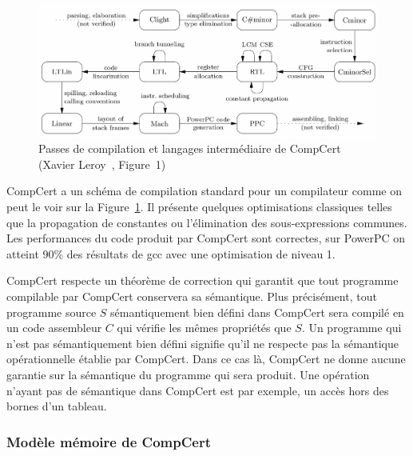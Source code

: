 \documentclass[11pt]{sdm}
\begin{document}
\begin{figure}
\centering
\includegraphics[scale=0.32]{images/compcert_pass.png}
\caption{Passes de compilation et langages intermédiaire de CompCert (Xavier Leroy~\cite{Leroy:2009:FVR:1538788.1538814}, Figure~1)}
\label{compcert_passes}
\end{figure}

CompCert a un schéma de compilation standard pour un compilateur comme on peut le voir sur la Figure~\ref{compcert_passes}. Il présente quelques optimisations classiques telles que la propagation de constantes ou l'élimination des sous-expressions communes. Les performances du code produit par CompCert sont correctes, sur PowerPC on atteint 90\% des résultats de gcc avec une optimisation de niveau 1.

CompCert respecte un théorème de correction qui garantit que tout programme compilable par CompCert conservera sa sémantique. Plus précisément, tout programme source $S$ sémantiquement bien défini dans CompCert sera compilé en un code assembleur $C$ qui vérifie les mêmes propriétés que $S$. Un programme qui n'est pas sémantiquement bien défini signifie qu'il ne respecte pas la sémantique opérationnelle établie par CompCert. Dans ce cas là, CompCert ne donne aucune garantie sur la sémantique du programme qui sera produit. Une opération n'ayant pas de sémantique dans CompCert est par exemple, un accès hors des bornes d'un tableau.

\subsubsection{Modèle mémoire de CompCert}
\end{document}

